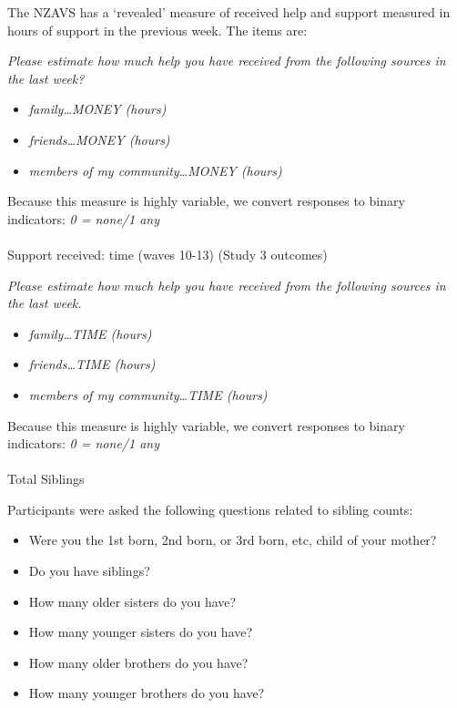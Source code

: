 \documentclass[
  single column]{article}
\makeatletter
\let\oldparagraph\paragraph
\renewcommand{\paragraph}{
    \@ifstar
      \xxxParagraphStar
      \xxxParagraphNoStar
  }
\newcommand{\xxxParagraphStar}[1]{\oldparagraph*{#1}\mbox{}}
\newcommand{\xxxParagraphNoStar}[1]{\oldparagraph{#1}\mbox{}}
\providecommand{\tightlist}{%
  \setlength{\itemsep}{0pt}\setlength{\parskip}{0pt}}\usepackage{longtable,booktabs,array}
\makeatother
\begin{document}
The NZAVS has a `revealed' measure of received help and support measured
in hours of support in the previous week. The items are:

\emph{Please estimate how much help you have received from the following
sources in the last week?}

\begin{itemize}
\tightlist
\item
  \emph{family\ldots MONEY (hours)}
\item
  \emph{friends\ldots MONEY (hours)}
\item
  \emph{members of my community\ldots MONEY (hours)}
\end{itemize}

Because this measure is highly variable, we convert responses to binary
indicators: \emph{0 = none/1 any}

\paragraph{Support received: time (waves 10-13) (Study 3
outcomes)}\label{support-received-time-waves-10-13-study-3-outcomes}

\emph{Please estimate how much help you have received from the following
sources in the last week.}

\begin{itemize}
\tightlist
\item
  \emph{family\ldots TIME (hours)}
\item
  \emph{friends\ldots TIME (hours)}
\item
  \emph{members of my community\ldots TIME (hours)}
\end{itemize}

Because this measure is highly variable, we convert responses to binary
indicators: \emph{0 = none/1 any}

\paragraph{Total Siblings}\label{total-siblings}

Participants were asked the following questions related to sibling
counts:

\begin{itemize}
\tightlist
\item
  Were you the 1st born, 2nd born, or 3rd born, etc, child of your
  mother?
\item
  Do you have siblings?
\item
  How many older sisters do you have?
\item
  How many younger sisters do you have?
\item
  How many older brothers do you have?
\item
  How many younger brothers do you have?
\end{itemize}
\end{document}

